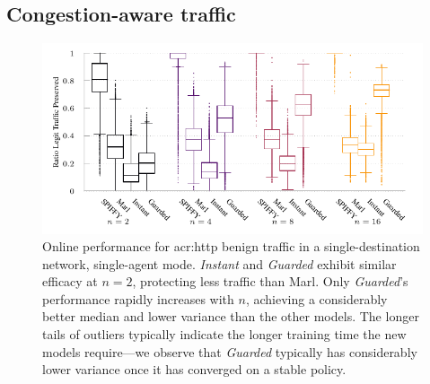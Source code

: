 \subsection{Congestion-aware traffic}
%	
\begin{figure}
	\centering
	\includegraphics[width=\linewidth]{plots/marl/tnsm-tcp-box-single}
	\caption[Online performance for HTTP benign traffic in a single-destination network, single-agent mode.]{
		Online performance for \gls{acr:http} benign traffic in a single-destination network, single-agent mode.
		\emph{Instant} and \emph{Guarded} exhibit similar efficacy at $n=2$, protecting less traffic than Marl.
		Only \emph{Guarded}'s performance rapidly increases with $n$, achieving a considerably better median and lower variance than the other models.
		The longer tails of outliers typically indicate the longer training time the new models require---we observe that \emph{Guarded} typically has considerably lower variance once it has converged on a stable policy.
		\label{fig:tcp-tree-box}
	}
\end{figure}
%	
